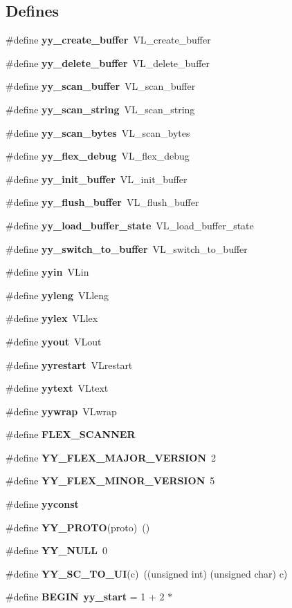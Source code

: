 \subsection*{Defines}
\begin{CompactItemize}
\item 
\#define {\bf yy\_\-create\_\-buffer}\ VL\_\-create\_\-buffer
\item 
\#define {\bf yy\_\-delete\_\-buffer}\ VL\_\-delete\_\-buffer
\item 
\#define {\bf yy\_\-scan\_\-buffer}\ VL\_\-scan\_\-buffer
\item 
\#define {\bf yy\_\-scan\_\-string}\ VL\_\-scan\_\-string
\item 
\#define {\bf yy\_\-scan\_\-bytes}\ VL\_\-scan\_\-bytes
\item 
\#define {\bf yy\_\-flex\_\-debug}\ VL\_\-flex\_\-debug
\item 
\#define {\bf yy\_\-init\_\-buffer}\ VL\_\-init\_\-buffer
\item 
\#define {\bf yy\_\-flush\_\-buffer}\ VL\_\-flush\_\-buffer
\item 
\#define {\bf yy\_\-load\_\-buffer\_\-state}\ VL\_\-load\_\-buffer\_\-state
\item 
\#define {\bf yy\_\-switch\_\-to\_\-buffer}\ VL\_\-switch\_\-to\_\-buffer
\item 
\#define {\bf yyin}\ VLin
\item 
\#define {\bf yyleng}\ VLleng
\item 
\#define {\bf yylex}\ VLlex
\item 
\#define {\bf yyout}\ VLout
\item 
\#define {\bf yyrestart}\ VLrestart
\item 
\#define {\bf yytext}\ VLtext
\item 
\#define {\bf yywrap}\ VLwrap
\item 
\#define {\bf FLEX\_\-SCANNER}
\item 
\#define {\bf YY\_\-FLEX\_\-MAJOR\_\-VERSION}\ 2
\item 
\#define {\bf YY\_\-FLEX\_\-MINOR\_\-VERSION}\ 5
\item 
\#define {\bf yyconst}
\item 
\#define {\bf YY\_\-PROTO}(proto)\ ()
\item 
\#define {\bf YY\_\-NULL}\ 0
\item 
\#define {\bf YY\_\-SC\_\-TO\_\-UI}(c)\ ((unsigned int) (unsigned char) c)
\item 
\#define {\bf BEGIN}\ {\bf yy\_\-start} = 1 + 2 $\ast$
\item 

\end{CompactItemize}
